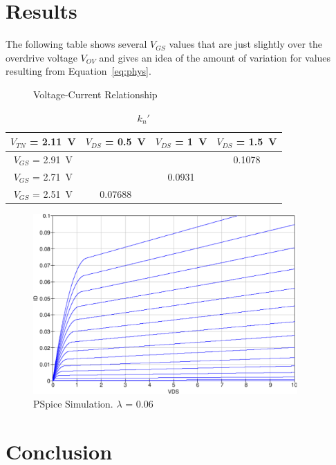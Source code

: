 \section{Results}
\label{sec:results}

The following table shows several $V_{GS}$ values that are just slightly over the overdrive voltage $V_{OV}$ and gives an idea of the amount of variation for values resulting from Equation~\ref{eq:phys}.

\begin{figure}[hbtp]
  \centering
  \resizebox{1.0\textwidth}{!}{}
  \caption{\label{fig:graph} Voltage-Current Relationship}
\end{figure}

\begin{table}[hbtp]
  \centering
  \begin{tabular}{c|ccc}
    $V_{TN}$ = \SI{2.11}{V} & $V_{DS}$ = \SI{0.5}{V} & $V_{DS}$ = \SI{1}{V} & $V_{DS}$ = \SI{1.5}{V} \\
    \hline
    $V_{GS}$ = \SI{2.91}{V} & & & 0.1078 \\
    $V_{GS}$ = \SI{2.71}{V} & & 0.0931 & \\
    $V_{GS}$ = \SI{2.51}{V} & 0.07688 & & \\
  \end{tabular}
  \caption{\label{tab:kn} $k_n'$}
\end{table}

\begin{figure}[hbtp]
  \centering
  \includegraphics[width=0.9\textwidth]{lambda6}
  \caption{\label{fig:lambda6} PSpice Simulation. $\lambda$ = 0.06}
\end{figure}

\section{Conclusion}
\label{sec:conclusion}

